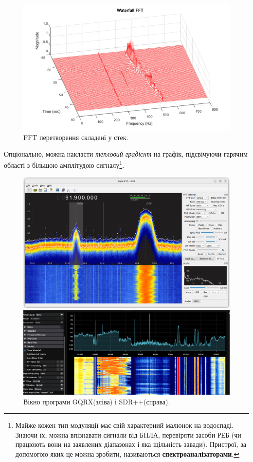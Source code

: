 \documentclass{article}
\begin{document}
\begin{figure}[h!]
\centering
\includegraphics[width=0.75\linewidth]{images/fft-stack.png}
\caption{\label{fig:fft-stack}FFT перетворення складені у стек.}
\end{figure}

Опціонально, можна накласти \textit{тепловий градієнт} на графік, підсвічуючи гарячим області з більшою амплітудою сигналу\footnote{Майже кожен тип модуляції має свій характерний малюнок на водоспаді. Знаючи їх, можна впізнавати сигнали від БПЛА, перевіряти засоби РЕБ (чи працюють вони на заявлених діапазонах і яка щільність завади). Пристрої, за допомогою яких це можна зробити, називаються \textbf{спектроаналізаторами}.}.

\begin{figure}[H]
    \centering
       \begin{minipage}{0.35\textwidth}
        \centering
        \includegraphics[width=\textwidth]{images/gqrx.png}
    \end{minipage}
    \begin{minipage}{0.55\textwidth}
        \centering
        \includegraphics[width=\textwidth]{images/sdrpp.png}
    \end{minipage}
    \caption{Вікно програми GQRX(зліва) і SDR++(справа).}
\end{figure}
\end{document}
